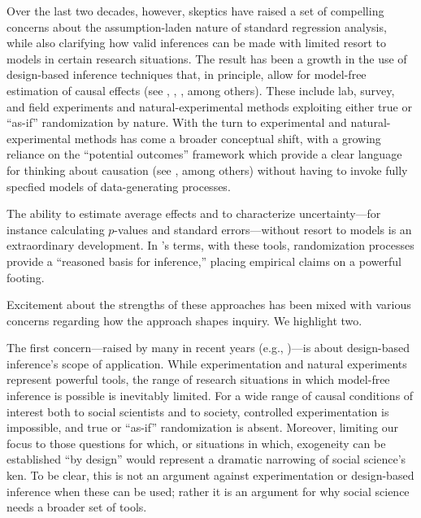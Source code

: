 \documentclass[
  12pt,
]{book}
\begin{document}
Over the last two decades, however, skeptics have raised a set of compelling concerns about the assumption-laden nature of standard regression analysis, while also clarifying how valid inferences can be made with limited resort to models in certain research situations. The result has been a growth in the use of design-based inference techniques that, in principle, allow for model-free estimation of causal effects (see \citet{dunning2012natural}, \citet{GerGreKap04}, \citet{druckman2011experimentation}, \citet{palfrey2009laboratory} among others). These include lab, survey, and field experiments and natural-experimental methods exploiting either true or ``as-if'' randomization by nature. With the turn to experimental and natural-experimental methods has come a broader conceptual shift, with a growing reliance on the ``potential outcomes'' framework which provide a clear language for thinking about causation (see \citet{Rubin1974}, \citet{splawa1990application} among others) without having to invoke fully specfied models of data-generating processes.

The ability to estimate average effects and to characterize uncertainty---for instance calculating \(p\)-values and standard errors---without resort to models is an extraordinary development. In \citet{fisher1935design}'s terms, with these tools, randomization processes provide a ``reasoned basis for inference,'' placing empirical claims on a powerful footing.

Excitement about the strengths of these approaches has been mixed with various concerns regarding how the approach shapes inquiry. We highlight two.

The first concern---raised by many in recent years (e.g., \citet{thelen2015comparative})---is about design-based inference's scope of application. While experimentation and natural experiments represent powerful tools, the range of research situations in which model-free inference is possible is inevitably limited. For a wide range of causal conditions of interest both to social scientists and to society, controlled experimentation is impossible, and true or ``as-if'' randomization is absent. Moreover, limiting our focus to those questions for which, or situations in which, exogeneity can be established ``by design'' would represent a dramatic narrowing of social science's ken. To be clear, this is not an argument against experimentation or design-based inference when these can be used; rather it is an argument for why social science needs a broader set of tools.
\end{document}
